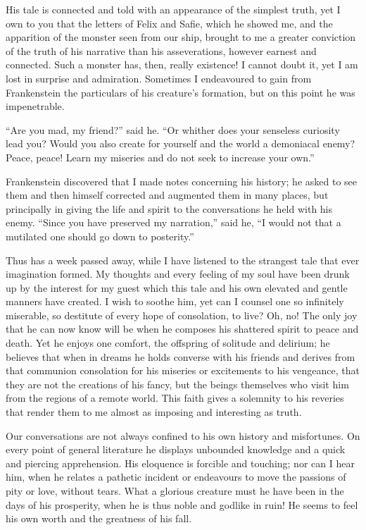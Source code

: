 \documentclass[12pt,openright]{book}
\begin{document}
His tale is connected and told with an appearance of the simplest truth, yet I own to you that the letters of Felix and Safie, which he showed me, and the apparition of the monster seen from our ship, brought to me a greater conviction of the truth of his narrative than his asseverations, however earnest and connected. Such a monster has, then, really existence! I cannot doubt it, yet I am lost in surprise and admiration. Sometimes I endeavoured to gain from Frankenstein the particulars of his creature’s formation, but on this point he was impenetrable.

“Are you mad, my friend?” said he. “Or whither does your senseless curiosity lead you? Would you also create for yourself and the world a demoniacal enemy? Peace, peace! Learn my miseries and do not seek to increase your own.”

Frankenstein discovered that I made notes concerning his history; he asked to see them and then himself corrected and augmented them in many places, but principally in giving the life and spirit to the conversations he held with his enemy. “Since you have preserved my narration,” said he, “I would not that a mutilated one should go down to posterity.”

Thus has a week passed away, while I have listened to the strangest tale that ever imagination formed. My thoughts and every feeling of my soul have been drunk up by the interest for my guest which this tale and his own elevated and gentle manners have created. I wish to soothe him, yet can I counsel one so infinitely miserable, so destitute of every hope of consolation, to live? Oh, no! The only joy that he can now know will be when he composes his shattered spirit to peace and death. Yet he enjoys one comfort, the offspring of solitude and delirium; he believes that when in dreams he holds converse with his friends and derives from that communion consolation for his miseries or excitements to his vengeance, that they are not the creations of his fancy, but the beings themselves who visit him from the regions of a remote world. This faith gives a solemnity to his reveries that render them to me almost as imposing and interesting as truth.

Our conversations are not always confined to his own history and misfortunes. On every point of general literature he displays unbounded knowledge and a quick and piercing apprehension. His eloquence is forcible and touching; nor can I hear him, when he relates a pathetic incident or endeavours to move the passions of pity or love, without tears. What a glorious creature must he have been in the days of his prosperity, when he is thus noble and godlike in ruin! He seems to feel his own worth and the greatness of his fall.
\end{document}
